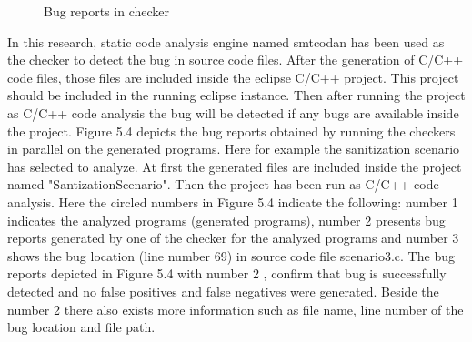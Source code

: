 \begin{figure}[htbp]
	\centering
	\label{fig:bugDetection}
	\vspace{-24em}
	\caption{Bug reports in checker}
\end{figure}


In this research, static code analysis engine named smtcodan has been used as the checker to detect the bug in source code files. After the generation of C/C++ code files, those files are included inside the eclipse C/C++ project. This project should be included in the running eclipse instance. Then after running the project as C/C++ code analysis the bug will be detected if any bugs are available inside the project. Figure 5.4 depicts the bug reports obtained by running the checkers in parallel on the generated programs. Here for example the sanitization scenario has selected to analyze. At first the generated files are included inside the project named "SantizationScenario". Then the project has been run as C/C++ code analysis. Here the circled numbers in Figure 5.4 indicate the following: number 1 indicates the analyzed programs (generated programs), number
2 presents bug reports generated by one of the checker for the analyzed programs and number 3 shows the
bug location (line number 69) in source code file scenario3.c. The bug reports depicted in Figure 5.4 with number
2 , confirm that bug is successfully detected and no
false positives and false negatives were generated. Beside the number 2 there also exists more information such as file name, line number of the bug location and file path. 

